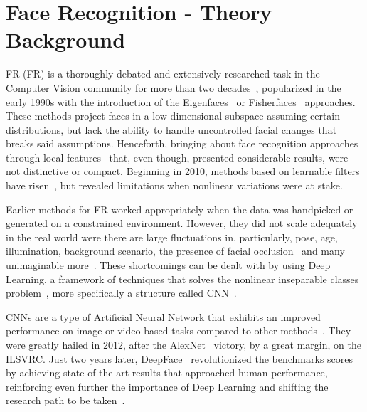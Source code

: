 \documentclass[class=report, crop=false, a4paper, 12pt]{standalone}
\begin{document}

\section{Face Recognition - Theory Background}
\par \acrlong{FR} (FR) is a thoroughly debated and extensively researched task in the Computer Vision community for more than two decades~\autocite{ranjanDeepLearningUnderstanding2018}, popularized in the early 1990s with the introduction of the Eigenfaces~\autocite{turkEigenfacesRecognition1991} or Fisherfaces~\autocite{p.n.belhumeurEigenfacesVsFisherfaces1997} approaches. These methods project faces in a low-dimensional subspace assuming certain distributions, but lack the ability to handle uncontrolled facial changes that breaks said assumptions. Henceforth, bringing about face recognition approaches through local-features~\autocite{chengjunliuGaborFeatureBased2002, ahonenFaceDescriptionLocal2006} that, even though, presented considerable results, were not distinctive or compact. Beginning in 2010, methods based on learnable filters have risen~\autocite{z.caoFaceRecognitionLearningbased2010,leiLearningDiscriminantFace2014}, but revealed limitations when nonlinear variations were at stake.

\par Earlier methods for FR worked appropriately when the data was handpicked or generated on a constrained environment. However, they did not scale adequately in the real world were there are large fluctuations in, particularly, pose, age, illumination, background scenario, the presence of facial occlusion~\autocite{ranjanDeepLearningUnderstanding2018} and many unimaginable more~\autocite{kalkaIJBIARPAJanus2018}. These shortcomings can be dealt with by using Deep Learning, a framework of techniques that solves the nonlinear inseparable classes problem~\autocite{minsky69perceptrons}, more specifically a structure called \gls{CNN}~\autocite{wangDeepFaceRecognition2021}. 

\par CNNs are a type of Artificial Neural Network that exhibits an improved performance on image or video-based tasks compared to other methods~\autocite{lecunGradientBasedLearningApplied1998}. They were greatly hailed in 2012, after the AlexNet~\autocite{krizhevskyImageNetClassificationDeep2012} victory, by a great margin, on the \gls{ILSVRC}. Just two years later, DeepFace~\autocite{taigmanDeepFaceClosingGap2014} revolutionized the benchmarks scores by achieving state-of-the-art results that approached human performance, reinforcing even further the importance of Deep Learning and shifting the research path to be taken~\autocite{wangDeepFaceRecognition2021}.
\end{document}
